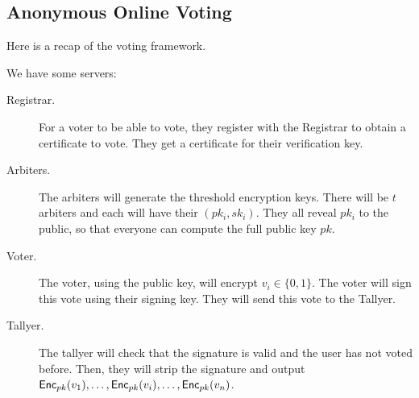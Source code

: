 \subsection{Anonymous Online Voting}

Here is a recap of the voting framework.

We have some servers:
\begin{description}
    \item[Registrar.] For a voter to be able to vote, they register with the Registrar to obtain a certificate to vote. They get a certificate for their verification key.
    \item[Arbiters.] The arbiters will generate the threshold encryption keys. There will be $t$ arbiters and each will have their $(pk_i, sk_i)$. They all reveal $pk_i$ to the public, so that everyone can compute the full public key $pk$.
    \item[Voter.] The voter, using the public key, will encrypt $v_i \in\{0, 1\}$. The voter will sign this vote using their signing key. They will send this vote to the Tallyer.
    \item[Tallyer.] The tallyer will check that the signature is valid and the user has not voted before. Then, they will strip the signature and output $\operatorname{\mathsf{Enc}}_{pk}(v_1), \dots, \operatorname{\mathsf{Enc}}_{pk}(v_i), \dots, \operatorname{\mathsf{Enc}}_{pk}(v_n)$.
\end{description}



